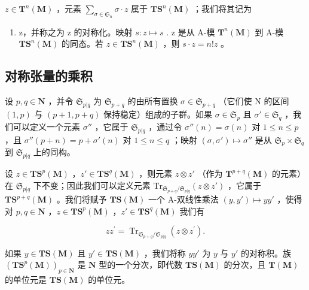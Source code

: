 \(z \in \mathbf{T}^n(\mathbf{M})\) ，元素 \(\sum_{\sigma \in \mathfrak{S}_n} \sigma \cdot z\) 属于 \(\mathbf{T}\mathbf{S}^n(\mathbf{M})\) ；我们将其记为

\begin{enumerate}
\def\labelenumi{\alph{enumi}.}
\setcounter{enumi}{18}
\tightlist
\item
  z，并称之为 z 的对称化。映射 \(s: z \mapsto s\) . z 是从 A-模 \(\mathbf{T}^{n}(\mathbf{M})\) 到 A-模 \(\mathbf{T}\mathbf{S}^{n}(\mathbf{M})\) 的同态。若 \(z \in \mathbf{T}\mathbf{S}^{n}(\mathbf{M})\) ，则 \(s \cdot z = n! z\) 。
\end{enumerate}

\subsection{对称张量的乘积}

设 \(p, q \in \mathbf{N}\) ，并令 \(\mathfrak{S}_{p|q}\) 为 \(\mathfrak{S}_{p+q}\) 的由所有置换 \(\sigma \in \mathfrak{S}_{p+q}\) （它们使 N 的区间 \((1, p)\) 与 \((p+1, p+q)\) 保持稳定）组成的子群。如果 \(\sigma \in \mathfrak{S}_p\) 且 \(\sigma' \in \mathfrak{S}_q\) ，我们可以定义一个元素 \(\sigma''\) ，它属于 \(\mathfrak{S}_{p|q}\) ，通过令 \(\sigma''(n) = \sigma(n)\) 对 \(1 \leqslant n \leqslant p\) ，且 \(\sigma''(p+n) = p + \sigma'(n)\) 对 \(1 \leqslant n \leqslant q\) ；映射 \((\sigma, \sigma') \mapsto \sigma''\) 是从 \(\mathfrak{S}_p \times \mathfrak{S}_q\) 到 \(\mathfrak{S}_{p|q}\) 上的同构。

设 \(z \in \mathbf{TS}^p(\mathbf{M})\) ，\(z' \in \mathbf{TS}^q(\mathbf{M})\) ，则元素 \(z \otimes z'\) （作为 \(\mathbf{T}^{p + q}(\mathbf{M})\) 的元素）在 \(\mathfrak{S}_{p|q}\) 下不变；因此我们可以定义元素 \(\mathrm{Tr}_{\mathfrak{S}_{p + q}/\mathfrak{S}_{p|q}}(z \otimes z')\) ，它属于 \(\mathbf{TS}^{p + q}(\mathbf{M})\) 。我们将赋予 \(\mathbf{TS}(\mathbf{M})\) 一个 A-双线性乘法 \((y, y') \mapsto yy'\) ，使得对 \(p, q \in \mathbf{N}\) ，\(z \in \mathbf{TS}^p(\mathbf{M})\) ，\(z' \in \mathbf{TS}^q(\mathbf{M})\) 我们有

\[
z z ^ {\prime} = \operatorname{Tr} _ {\mathfrak {S} _ {p + q} / \mathfrak {S} _ {p | q}} (z \otimes z ^ {\prime}).\tag{4}
\]

如果 \(y \in \mathbf{TS}(\mathbf{M})\) 且 \(y' \in \mathbf{TS}(\mathbf{M})\) ，我们将称 \(yy'\) 为 \(y\) 与 \(y'\) 的对称积。族 \((\mathbf{TS}^p(\mathbf{M}))_{p \in \mathbf{N}}\) 是 \(\mathbf{N}\) 型的一个分次，即代数 \(\mathbf{TS}(\mathbf{M})\) 的分次，且 \(\mathbf{T}(\mathbf{M})\) 的单位元是 \(\mathbf{TS}(\mathbf{M})\) 的单位元。

